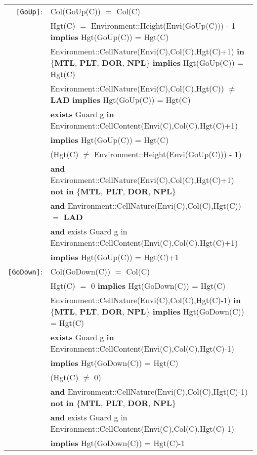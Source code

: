\documentclass[7pt]{article}
\begin{document}
\begin{tabular}{rl}
\texttt{[GoUp]}: & \textrm{Col(GoUp(C))} $=$ \textrm{Col(C)}\\
& \textrm{Hgt(C)} $=$ Environment::Height(Envi(GoUp(C))) - 1 \textbf{implies} \textrm{Hgt(GoUp(C))} = \textrm{Hgt(C)} \\
& \textrm{Environment::CellNature(Envi(C),Col(C),Hgt(C)+1)} \textbf{in} \{\textbf{MTL}, \textbf{PLT}, \textbf{DOR}, \textbf{NPL}\} \textbf{implies} \textrm{Hgt(GoUp(C))} = \textrm{Hgt(C)} \\
& \textrm{Environment::CellNature(Envi(C),Col(C),Hgt(C))} $\neq$ \textbf{LAD} \textbf{implies} \textrm{Hgt(GoUp(C))} = \textrm{Hgt(C)} \\
& \textbf{exists} \textrm{Guard} g \textbf{in} \textrm{Environment::CellContent(Envi(C),Col(C),Hgt(C)+1)} \\ & \quad\quad \textbf{implies} \textrm{Hgt(GoUp(C))} = \textrm{Hgt(C)}  \\
& (\textrm{Hgt(C)} $\neq$ Environment::Height(Envi(GoUp(C))) - 1) \\ 
&  \quad\quad \textbf{and} \textrm{Environment::CellNature(Envi(C),Col(C),Hgt(C)+1)} \textbf{not} \textbf{in} \{\textbf{MTL}, \textbf{PLT}, \textbf{DOR}, \textbf{NPL}\} \\ 
& \quad\quad  \textbf{and} \textrm{Environment::CellNature(Envi(C),Col(C),Hgt(C))} $=$ \textbf{LAD} \\
& \quad\quad  \textbf{and} {exists} \textrm{Guard} g {in} \textrm{Environment::CellContent(Envi(C),Col(C),Hgt(C)+1)} \\ & \quad\quad \textbf{implies} \textrm{Hgt(GoUp(C))} = \textrm{Hgt(C)}+1  \\

\texttt{[GoDown]}: & \textrm{Col(GoDown(C))} $=$ \textrm{Col(C)}\\
& \textrm{Hgt(C)} $=$ 0 \textbf{implies} \textrm{Hgt(GoDown(C))} = \textrm{Hgt(C)} \\
& \textrm{Environment::CellNature(Envi(C),Col(C),Hgt(C)-1)} \textbf{in} \{\textbf{MTL}, \textbf{PLT}, \textbf{DOR}, \textbf{NPL}\} \textbf{implies} \textrm{Hgt(GoDown(C))} = \textrm{Hgt(C)} \\
& \textbf{exists} \textrm{Guard} g \textbf{in} \textrm{Environment::CellContent(Envi(C),Col(C),Hgt(C)-1)} \\ & \quad\quad \textbf{implies} \textrm{Hgt(GoDown(C))} = \textrm{Hgt(C)}  \\
& (\textrm{Hgt(C)} $\neq$ 0) \\ 
&  \quad\quad \textbf{and} \textrm{Environment::CellNature(Envi(C),Col(C),Hgt(C)-1)} \textbf{not} \textbf{in} \{\textbf{MTL}, \textbf{PLT}, \textbf{DOR}, \textbf{NPL}\} \\ 
& \quad\quad  \textbf{and} {exists} \textrm{Guard} g {in} \textrm{Environment::CellContent(Envi(C),Col(C),Hgt(C)-1)} \\ & \quad\quad \textbf{implies} \textrm{Hgt(GoDown(C))} = \textrm{Hgt(C)}-1  \\
\end{tabular}
\end{document}
